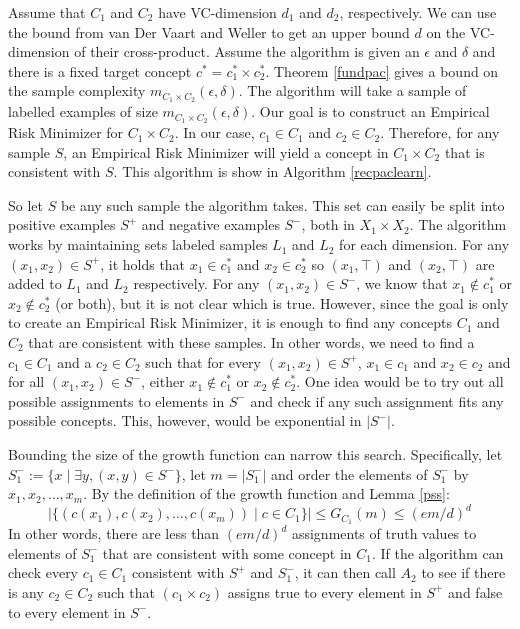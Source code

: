 Assume that $C_1$ and $C_2$ have VC-dimension $d_1$ and $d_2$, respectively. 
We can use the bound from van Der Vaart and Weller to get an upper bound $d$ on the VC-dimension of their cross-product.
Assume the algorithm is given an $\epsilon$ and $\delta$ and there is a fixed target concept $c^* = c_1^* \times c_2^*$.
Theorem \ref{fundpac} gives a bound on the sample complexity $m_{C_1 \times C_2}(\epsilon, \delta)$. 
The algorithm will take a sample of labelled examples of size $m_{C_1 \times C_2}(\epsilon, \delta)$. 
Our goal is to construct an Empirical Risk Minimizer for $C_1 \times C_2$. 
In our case, $c_1 \in C_1$ and $c_2 \in C_2$.
Therefore,  for any sample $S$, an Empirical Risk Minimizer will yield a concept in $C_1 \times C_2$ that is consistent with $S$. 
This algorithm is show in Algorithm \ref{recpaclearn}.


So let $S$ be any such sample the algorithm takes. 
This set can easily be split into positive examples $S^+$ and negative examples $S^-$, both in $X_1 \times X_2$.
The algorithm works by maintaining sets labeled samples $L_1$ and $L_2$ for each dimension. 
For any $(x_1, x_2) \in S^+$, it holds that $x_1 \in c^*_1$ and $x_2 \in c^*_2$ so $(x_1, \top)$ and $(x_2, \top)$ are added to $L_1$ and $L_2$ respectively. 
For any $(x_1, x_2) \in S^-$, we know that $x_1 \not\in c^*_1$ or $x_2 \not\in c^*_2$ (or both), but it is not clear which is true. 
However, since the goal is only to create an Empirical Risk Minimizer, it is enough to find any concepts $C_1$ and $C_2$ that are consistent with these samples. 
In other words, we need to find a $c_1 \in C_1$ and a $c_2 \in C_2$ such that for every $(x_1, x_2) \in S^+$, $x_1 \in c_1$ and $x_2 \in c_2$ and for all $(x_1, x_2) \in S^-$, either $x_1 \not\in c^*_1$ or $x_2 \not\in c^*_2$.
One idea would be to try out all possible assignments to elements in $S^-$ and check if any such assignment fits any possible concepts. 
This, however, would be exponential in $|S^-|$. 

Bounding the size of the growth function can narrow this search. 
Specifically, let $S_1^- := \{ x \mid \exists y, (x,y) \in S^-\}$, let $m = |S_1^-|$ and order the elements of $S_1^-$ by $x_1, x_2, \dots, x_m$. %
By the definition of the growth function and Lemma \ref{pss}:
\[ |\{ (c(x_1), c(x_2), \dots, c(x_m)) \mid c \in C_1\}| \le G_{C_1}(m) \le (em/d)^d \]
In other words, there are less than $(em/d)^d$ assignments of truth values to elements of $S_1^-$ that are consistent with some concept in $C_1$.
If the algorithm can check every $c_1 \in C_1$ consistent with $S^+$ and $S^-_1$, it can then call $A_2$ to see if there is any $c_2 \in C_2$ such that $(c_1 \times c_2)$ assigns true to every element in $S^+$ and false to every element in $S^-$.  

